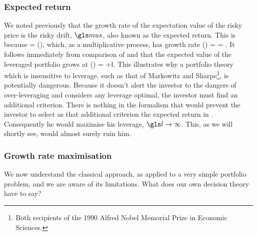 \subsubsection{Expected return}
We noted previously that the growth rate of the expectation value of the risky price is the risky drift, $\mus$, also known as the expected return. This is because
\be
\ave{\xone(\tn+\Dt)} = \ave{\xone(\tn)}\exp(\mus \Dt),
\ee
which, as a multiplicative process, has growth rate
\be
\gm(\ave{\xone}) = \frac{\D\ln\ave{\xone}}{\Dt} = \mus.
\ee
It follows immediately from comparison of  and  that the expected value of the leveraged portfolio grows at
\be
\gm(\ave{\xl}) = \mur+\l\mue.
\ee
This illustrates why a portfolio theory which is insensitive to leverage, such as that of Markowitz and Sharpe\footnote{Both recipients of the 1990 Alfred Nobel Memorial Prize in Economic Sciences.}, is potentially dangerous. Because it doesn't alert the investor to the dangers of over-leveraging and considers any leverage optimal, the investor must find an additional criterion. There is nothing in the formalism that would prevent the investor to select as that additional criterion the expected return in . Consequently he would maximise his leverage, $\l\to\infty$. This, as we will shortly see, would almost surely ruin him.

\subsubsection{Growth rate maximisation}
We now understand the classical approach, as applied to a very simple portfolio problem, and we are aware of its limitations. What does our own decision theory have to say?

